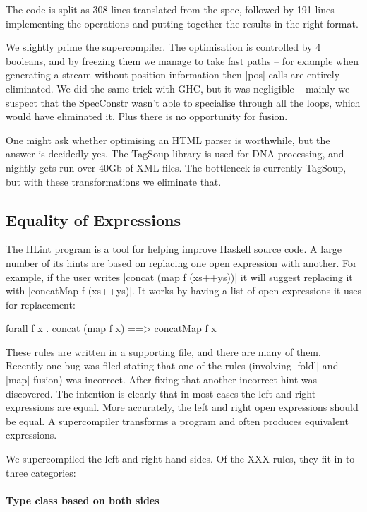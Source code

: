 \documentclass{sigplanconf}
\newcommand{\unknown}{XXX}
\begin{document}
The code is split as 308 lines translated from the spec, followed by 191 lines implementing the operations and putting together the results in the right format.

We slightly prime the supercompiler. The optimisation is controlled by 4 booleans, and by freezing them we manage to take fast paths -- for example when generating a stream without position information then |pos| calls are entirely eliminated. We did the same trick with GHC, but it was negligible -- mainly we suspect that the SpecConstr wasn't able to specialise through all the loops, which would have eliminated it. Plus there is no opportunity for fusion.

One might ask whether optimising an HTML parser is worthwhile, but the answer is decidedly yes. The TagSoup library is used for DNA processing, and nightly gets run over 40Gb of XML files. The bottleneck is currently TagSoup, but with these transformations we eliminate that.

\subsection{Equality of Expressions}
\label{sec:hlint}

The HLint program \cite{hlint} is a tool for helping improve Haskell source code. A large number of its hints are based on replacing one open expression with another. For example, if the user writes |concat (map f (xs++ys))| it will suggest replacing it with |concatMap f (xs++ys)|. It works by having a list of open expressions it uses for replacement:

\begin{code}
forall f x . concat (map f x) ==> concatMap f x
\end{code}

These rules are written in a supporting file, and there are many of them. Recently one bug was filed stating that one of the rules (involving |foldl| and |map| fusion) was incorrect. After fixing that another incorrect hint was discovered. The intention is clearly that in most cases the left and right expressions are equal. More accurately, the left and right open expressions should be equal. A supercompiler transforms a program and often produces equivalent expressions.

We supercompiled the left and right hand sides. Of the \unknown{} rules, they fit in to three categories:

\paragraph{Type class based on both sides}
\end{document}
